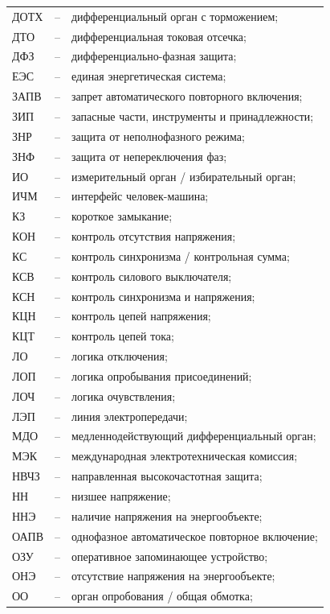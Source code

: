 \begin{longtable}{>{\raggedright\arraybackslash}m{2cm}>{\raggedright\arraybackslash}m{0.5cm}>{\raggedright\arraybackslash}m{20cm}}
ДОТХ & -- & дифференциальный орган с торможением; \\
ДТО & -- & дифференциальная токовая отсечка; \\
ДФЗ & -- & дифференциально-фазная защита; \\
ЕЭС & -- & единая энергетическая система; \\
ЗАПВ & -- & запрет автоматического повторного включения; \\
ЗИП & -- & запасные части, инструменты и принадлежности; \\
ЗНР & -- & защита от неполнофазного режима; \\
ЗНФ & -- & защита от непереключения фаз; \\
ИО & -- & измерительный орган / избирательный орган; \\
ИЧМ & -- & интерфейс человек-машина; \\
КЗ & -- & короткое замыкание; \\
КОН & -- & контроль отсутствия напряжения; \\
КС & -- & контроль синхронизма / контрольная сумма; \\
КСВ & -- & контроль силового выключателя; \\
КСН & -- & контроль синхронизма и напряжения; \\
КЦН & -- & контроль цепей напряжения; \\
КЦТ & -- & контроль цепей тока; \\
ЛО & -- & логика отключения; \\
ЛОП & -- & логика опробывания присоединений; \\
ЛОЧ & -- & логика очувствления; \\
ЛЭП & -- & линия электропередачи; \\
МДО & -- & медленнодействующий дифференциальный орган; \\
МЭК & -- & международная электротехническая комиссия; \\
НВЧЗ & -- & направленная высокочастотная защита; \\
НН & -- & низшее напряжение; \\
ННЭ & -- & наличие напряжения на энергообъекте; \\
ОАПВ & -- & однофазное автоматическое повторное включение; \\
ОЗУ & -- & оперативное запоминающее устройство; \\
ОНЭ & -- & отсутствие напряжения на энергообъекте; \\
ОО & -- & орган опробования / общая обмотка; \\

\end{longtable}
